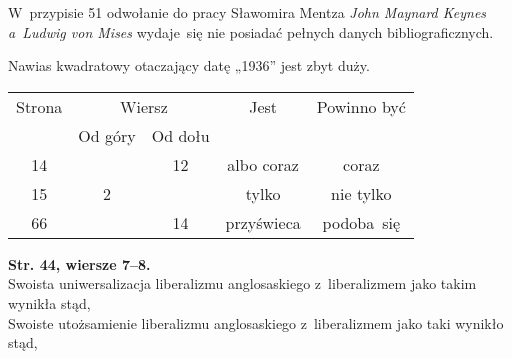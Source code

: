 \documentclass[a4paper,11pt]{article}
\begin{document}
\noindent
{} W~przypisie 51 odwołanie do pracy Sławomira Mentza \textit{John
  Maynard Keynes a~Ludwig von Mises} wydaje~się nie posiadać pełnych danych
bibliograficznych.

\vspace{\spaceFour}





\noindent
{} Nawias kwadratowy otaczający datę „1936” jest zbyt duży.

\vspace{\spaceFour}










\newpage



\begin{center}

  \begin{tabular}{|c|c|c|c|c|}
    \hline
    Strona & \multicolumn{2}{c|}{Wiersz} & Jest
                              & Powinno być \\ \cline{2-3}
    & Od góry & Od dołu & & \\
    \hline
    14  & & 12 & albo coraz & coraz \\
    15  &  2 & & tylko & nie tylko \\
    66  & & 14 & przyświeca & podoba~się \\
    \hline
  \end{tabular}

\end{center}

\vspace{\spaceTwo}


\noindent
\textbf{Str. 44, wiersze 7--8.} \\
\Jest  Swoista uniwersalizacja liberalizmu anglosaskiego z~liberalizmem
jako takim wynikła stąd, \\
\Powin Swoiste utożsamienie liberalizmu anglosaskiego z~liberalizmem
jako taki wynikło stąd, \\
\end{document}
